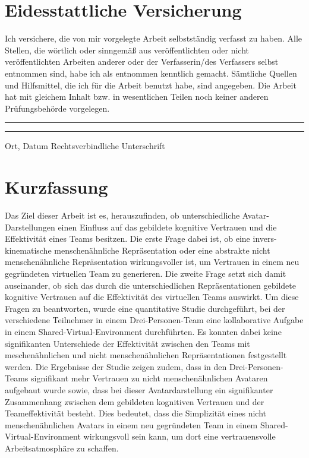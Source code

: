 \documentclass[a4paper,11pt]{article}%
\renewcommand{\\}{\vspace*{0.5\baselineskip} \newline}
\begin{document}
\section*{Eidesstattliche Versicherung}
	Ich versichere, die von mir vorgelegte Arbeit selbstständig verfasst zu haben. Alle Stellen, die wörtlich oder sinngemäß aus veröffentlichten oder nicht veröffentlichten Arbeiten anderer oder der Verfasserin/des Verfassers selbst entnommen sind, habe ich als entnommen kenntlich gemacht. Sämtliche Quellen und Hilfsmittel, die ich für die Arbeit benutzt habe, sind angegeben. Die Arbeit hat mit gleichem Inhalt bzw. in wesentlichen Teilen noch keiner anderen Prüfungsbehörde vorgelegen.\\
	~\\
	~\\
	\rule{0.35\textwidth}{0.4pt} \hspace*{3cm} \rule{0.45\textwidth}{0.4pt} \newline
	Ort, Datum	\hspace*{6.3cm}	Rechtsverbindliche Unterschrift
	\newpage
\section*{Kurzfassung}
Das Ziel dieser Arbeit ist es, herauszufinden, ob unterschiedliche Avatar-Darstellungen einen Einfluss auf das gebildete kognitive Vertrauen und die Effektivität eines Teams besitzen. Die erste Frage dabei ist, ob eine invers-kinematische menschenähnliche Repräsentation oder eine abstrakte nicht menschenähnliche Repräsentation wirkungsvoller ist, um Vertrauen in einem neu gegründeten virtuellen Team zu generieren. Die zweite Frage setzt sich damit auseinander, ob sich das durch die unterschiedlichen Repräsentationen gebildete kognitive Vertrauen auf die Effektivität des virtuellen Teams auswirkt. Um diese Fragen zu beantworten, wurde eine quantitative Studie durchgeführt, bei der verschiedene Teilnehmer in einem Drei-Personen-Team eine kollaborative Aufgabe in einem Shared-Virtual-Environment durchführten. Es konnten dabei keine signifikanten Unterschiede der Effektivität zwischen den Teams mit meschenähnlichen und nicht menschenähnlichen Repräsentationen festgestellt werden. Die Ergebnisse der Studie zeigen zudem, dass in den Drei-Personen-Teams signifikant mehr Vertrauen zu nicht menschenähnlichen Avataren aufgebaut wurde sowie, dass bei dieser Avatardarstellung ein signifikanter Zusammenhang zwischen dem gebildeten kognitiven Vertrauen und der Teameffektivität besteht. Dies bedeutet, dass die Simplizität eines nicht menschenähnlichen Avatars in einem neu gegründeten Team in einem Shared-Virtual-Environment wirkungsvoll sein kann, um dort eine vertrauensvolle Arbeitsatmosphäre zu schaffen. 
	
\end{document}
